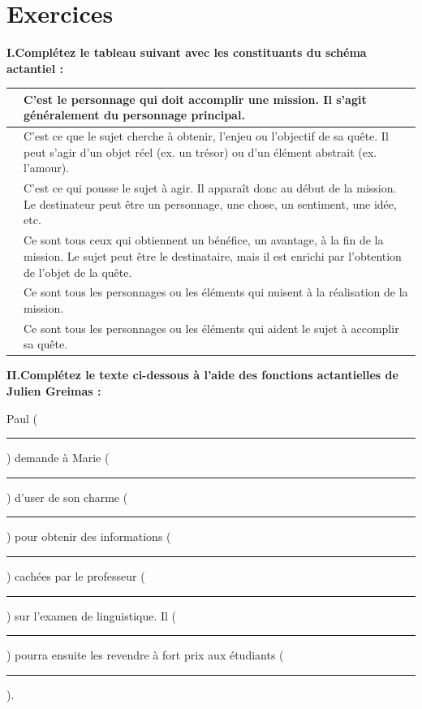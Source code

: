 \section*{Exercices}
\noindent\textbf{I.\quad Complétez le tableau suivant avec les constituants du schéma actantiel :}
\par\smallskip
{\small\setlength{\tabcolsep}{6pt}\renewcommand{\arraystretch}{1.3}
\noindent\begin{tabularx}{\textwidth}{|p{}|X|}\hline
\rule{0pt}{4em} & C’est le personnage qui doit accomplir une mission. Il s’agit généralement du personnage principal.\\\hline
\rule{0pt}{5em} & C’est ce que le sujet cherche à obtenir, l’enjeu ou l’objectif de sa quête. Il peut s’agir d’un objet réel (ex. un trésor) ou d’un élément abstrait (ex. l’amour).\\\hline
\rule{0pt}{5em} & C’est ce qui pousse le sujet à agir. Il apparaît donc au début de la mission. Le destinateur peut être un personnage, une chose, un sentiment, une idée, etc.\\\hline
\rule{0pt}{5.5em} & Ce sont tous ceux qui obtiennent un bénéfice, un avantage, à la fin de la mission. Le sujet peut être le destinataire, mais il est enrichi par l’obtention de l’objet de la quête.\\\hline
\rule{0pt}{4em} & Ce sont tous les personnages ou les éléments qui nuisent à la réalisation de la mission.\\\hline
\rule{0pt}{4em} & Ce sont tous les personnages ou les éléments qui aident le sujet à accomplir sa quête.\\\hline
\end{tabularx}}

\noindent\textbf{II.\quad Complétez le texte ci-dessous à l’aide des fonctions actantielles de Julien Greimas :}
\begin{keybox}
Paul (\rule{18mm}{.3pt}) demande à Marie (\rule{18mm}{.3pt}) d’user de son charme (\rule{18mm}{.3pt}) pour obtenir des informations (\rule{18mm}{.3pt}) cachées par le professeur (\rule{18mm}{.3pt}) sur l’examen de linguistique. Il (\rule{18mm}{.3pt}) pourra ensuite les revendre à fort prix aux étudiants (\rule{18mm}{.3pt}).
\end{keybox}

